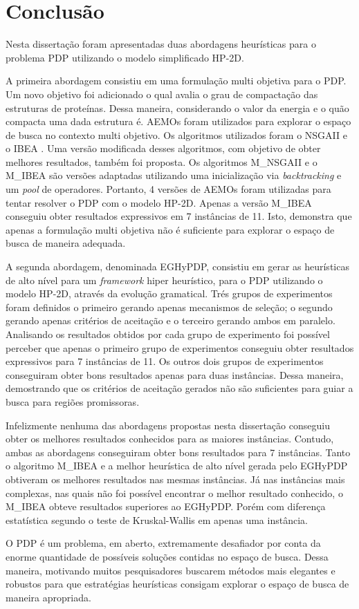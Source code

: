 \chapter{Conclusão}


Nesta dissertação foram apresentadas duas abordagens heurísticas para o problema PDP utilizando o modelo simplificado HP-2D. 

A primeira abordagem consistiu em uma formulação multi objetiva para o PDP. Um novo objetivo foi adicionado o qual avalia o grau de compactação das estruturas de proteínas. Dessa maneira, considerando o valor da energia e o quão compacta uma dada estrutura é. AEMOs foram utilizados para explorar o espaço de busca no contexto multi objetivo. Os algoritmos utilizados foram o NSGAII \cite{deb2002} e o IBEA \cite{zitzler2004indicator}. Uma versão modificada desses algoritmos, com objetivo de obter melhores resultados, também foi proposta. Os algoritmos M\_NSGAII e o M\_IBEA são versões adaptadas utilizando uma inicialização via \textit{backtracking}  e um \textit{pool} de operadores. Portanto, 4 versões de AEMOs foram utilizadas para tentar resolver o PDP com o modelo HP-2D. Apenas a versão M\_IBEA conseguiu obter resultados expressivos em 7 instâncias de 11. Isto, demonstra que apenas a formulação multi objetiva não é suficiente para explorar o espaço de busca de maneira adequada.  


A segunda abordagem, denominada EGHyPDP, consistiu em gerar as heurísticas de alto nível para um \textit{framework} hiper heurístico, para o PDP utilizando o modelo HP-2D, através da evolução gramatical. Trés grupos de experimentos foram definidos o primeiro gerando apenas mecanismos de seleção; o segundo gerando apenas critérios de aceitação e o terceiro gerando ambos em paralelo. Analisando os resultados obtidos por cada grupo de experimento foi possível perceber que apenas o primeiro grupo de experimentos conseguiu obter resultados expressivos para 7 instâncias de 11. Os outros dois grupos de experimentos conseguiram obter bons resultados apenas para duas instâncias. Dessa maneira, demostrando que os critérios de aceitação gerados não são suficientes para guiar a busca para regiões promissoras. 

Infelizmente nenhuma das abordagens propostas nesta dissertação conseguiu obter os melhores resultados conhecidos para as maiores instâncias. Contudo, ambas as abordagens conseguiram obter bons resultados para 7 instâncias. Tanto o algoritmo M\_IBEA e a melhor heurística de alto nível gerada pelo EGHyPDP obtiveram os melhores resultados nas mesmas instâncias. Já nas instâncias mais complexas, nas quais não foi possível encontrar o melhor resultado conhecido, o M\_IBEA obteve resultados superiores ao EGHyPDP. Porém com diferença estatística segundo o teste de Kruskal-Wallis \cite{mckight2010kruskal} em apenas uma instância.

O PDP é um problema, em aberto,  extremamente desafiador por conta da enorme quantidade de possíveis soluções contidas no espaço de busca. Dessa maneira,  motivando muitos pesquisadores buscarem métodos mais elegantes e robustos para que estratégias heurísticas consigam explorar o espaço de busca de maneira apropriada.



